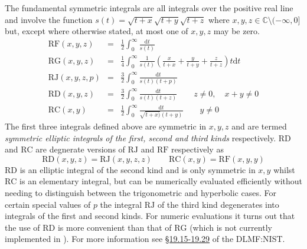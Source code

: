 The fundamental symmetric integrals are all integrals over the positive real
line and involve the function $s(t)=\sqrt{t+x}\sqrt{t+y}\sqrt{t+z}$ where
$x,y,z\in \mathbb{C} \setminus(-\infty, 0]$ but, except where otherwise stated, at most
one of $x,y,z$ may be zero.
\begin{eqnarray*}
\mathrm{RF}(x,y,z) & = & \frac{1}{2}\int_0^\infty \frac{\mathrm{d}t}{s(t)}\\
\mathrm{RG}(x,y,z) & = & \frac{1}{4}\int_0^\infty \frac{1}{s(t)}\left(
     \frac{x}{t+x}+\frac{y}{t+y}+\frac{z}{t+z}\right)t\mathrm{d}t\\
\mathrm{RJ}(x,y,z,p) & = & \frac{3}{2}\int_0^\infty \frac{\mathrm{d}t}{s(t)(t+p)}\\
\mathrm{RD}(x,y,z) & = & \frac{3}{2}\int_0^\infty \frac{\mathrm{d}t}{s(t)(t+z)}
\qquad z \neq 0, \quad x+y \neq 0\\
\mathrm{RC}(x,y) & = & \frac{1}{2}\int_0^\infty\frac{\mathrm{d}t}{\sqrt{t+x)}(t+y)}\qquad y \neq 0
\end{eqnarray*}
The first three integrals defined above are symmetric in $x,y,z$ and are termed
\emph{symmetric elliptic integrals of the first, second and third kinds}
respectively. $\mathrm{RD}$ and $\mathrm{RC}$ are degnerate versions of
$\mathrm{RJ}$ and $\mathrm{RF}$ respectively as
\[\mathrm{RD}(x,y,z) =\mathrm{RJ}(x,y,z,z) \qquad
\mathrm{RC}(x,y) =\mathrm{RF}(x,y,y) \]
$\mathrm{RD}$ is an elliptic integral of the second kind and is only symmetric
in $x,y$ whilst $\mathrm{RC}$ is an elementary integral, but can be numerically
evaluated efficiently without needing to distinguish between the trigonometric
and hyperbolic cases. For certain special values of $p$ the integral
$\mathrm{RJ}$ of the third kind degenerates into integrals of the first and
second kinds. For numeric evaluations it turns out that the use of $\mathrm{RD}$
is more convenient than that of $\mathrm{RG}$ (which is not currently
implemented in \REDUCE). For more information see
\href{https://dlmf.nist.gov/19#PT3}{\S19.15-19.29} of the DLMF:NIST.

